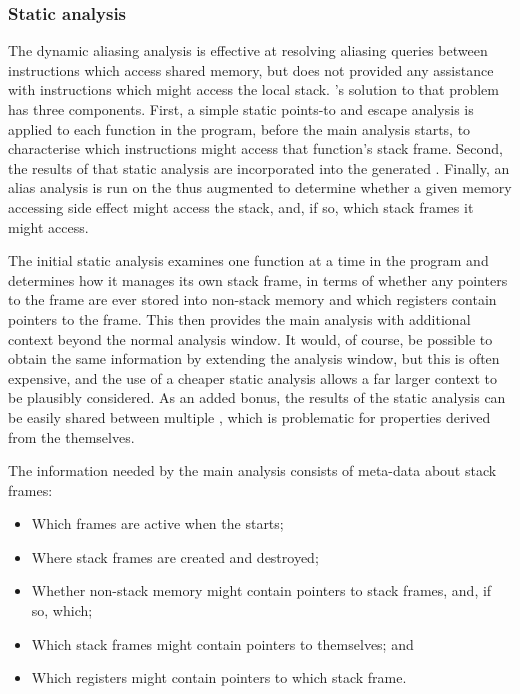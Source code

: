 
\subsubsection{Static analysis}



The dynamic aliasing analysis is effective at resolving aliasing
queries between instructions which access shared memory, but does not
provided any assistance with instructions which might access the local
stack.  {\Technique}'s solution to that problem has three components.
First, a simple static points-to and escape analysis is applied to
each function in the program, before the main analysis starts, to
characterise which instructions might access that function's stack
frame.  Second, the results of that static analysis are incorporated
into the generated {\StateMachines}.  Finally, an alias analysis is
run on the thus augmented {\StateMachines} to determine whether a
given memory accessing side effect might access the stack, and, if so,
which stack frames it might access.

The initial static analysis examines one function at a time in the
program and determines how it manages its own stack frame, in terms of
whether any pointers to the frame are ever stored into non-stack
memory and which registers contain pointers to the frame.  This then
provides the main analysis with additional context beyond the normal
analysis window.  It would, of course, be possible to obtain the same
information by extending the analysis window, but this is often
expensive, and the use of a cheaper static analysis allows a far
larger context to be plausibly considered.  As an added bonus, the
results of the static analysis can be easily shared between multiple
{\StateMachines}, which is problematic for properties derived from the
{\StateMachines} themselves.

The information needed by the main analysis consists of meta-data
about stack frames:

\begin{itemize}
\item
  Which frames are active when the {\StateMachine} starts;
\item
  Where stack frames are created and destroyed;
\item
  Whether non-stack memory might contain pointers to stack frames,
  and, if so, which;
\item
  Which stack frames might contain pointers to themselves; and
\item
  Which registers might contain pointers to which stack frame.
\end{itemize}

